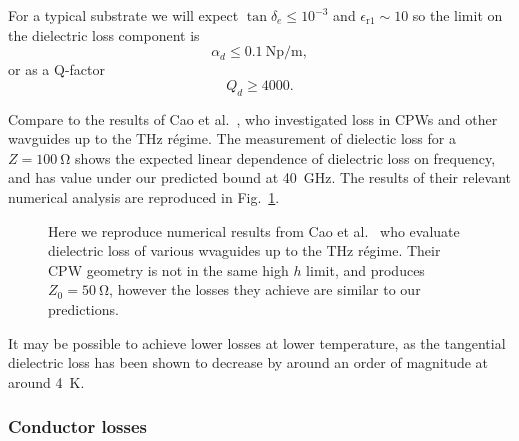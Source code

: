 For a typical substrate we will expect $\tan\delta_e\leq10^{-3}$ and
$\epsilon_\mathrm{r1} \sim 10$ so the limit on the dielectric loss component is
\begin{equation}
  \alpha_d \leq \SI{0.1}{\neper\per\meter},
\end{equation}
or as a Q-factor
\begin{equation}
  Q_d \geq 4000.
\end{equation}

Compare to the results of  Cao et al.~\cite{L.Cao2013}, who
investigated loss in CPWs and other wavguides up to the \si{\tera\hertz}
r\'egime. The measurement of dielectic loss for a $Z=\SI{100}{\ohm}$ shows the
expected linear dependence of dielectric loss on frequency, and has value under
our predicted bound at \SI{40}{\giga\hertz}. The results of their relevant
numerical analysis are reproduced in Fig.~\ref{fig:CaoFig9}.

\begin{figure}
  \caption{Here we reproduce numerical results from Cao et al.~\cite{L.Cao2013}
  who evaluate dielectric loss of various wvaguides up to the \si{\tera\hertz}
  r\'egime. Their CPW geometry is not in the same high $h$ limit, and produces
  $Z_0 = \SI{50}{\ohm}$, however the losses they achieve are similar to our
  predictions.
  }
  \label{fig:CaoFig9}
\end{figure}

It may be possible to achieve lower losses at lower temperature, as the
tangential dielectric loss has been shown to decrease by around an order of
magnitude at around \SI{4}{\kelvin}. \cite{1717770}

\subsubsection*{Conductor losses}

